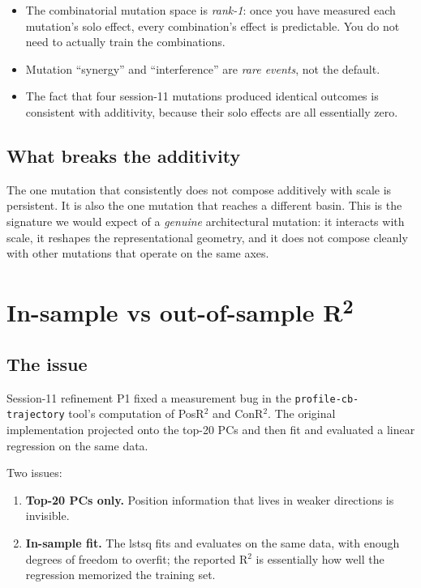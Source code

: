 \documentclass[11pt,openany]{book}
\begin{document}
\begin{itemize}
  \item The combinatorial mutation space is \emph{rank-1}: once you
  have measured each mutation's solo effect, every combination's
  effect is predictable. You do not need to actually train the
  combinations.
  \item Mutation ``synergy'' and ``interference'' are \emph{rare
  events}, not the default.
  \item The fact that four session-11 mutations produced identical
  outcomes is consistent with additivity, because their solo effects
  are all essentially zero.
\end{itemize}

\section{What breaks the additivity}

The one mutation that consistently does not compose additively with
scale is persistent. It is also the one mutation that reaches a
different basin. This is the signature we would expect of a
\emph{genuine} architectural mutation: it interacts with scale, it
reshapes the representational geometry, and it does not compose
cleanly with other mutations that operate on the same axes.

\chapter{In-sample vs out-of-sample R\textsuperscript{2}}

\section{The issue}

Session-11 refinement P1 fixed a measurement bug in the
\texttt{profile-cb-trajectory} tool's computation of PosR$^2$ and
ConR$^2$. The original implementation projected onto the top-20 PCs
and then fit and evaluated a linear regression on the same data.

Two issues:

\begin{enumerate}
  \item \textbf{Top-20 PCs only.} Position information that lives in
  weaker directions is invisible.
  \item \textbf{In-sample fit.} The lstsq fits and evaluates on the
  same data, with enough degrees of freedom to overfit; the reported
  R$^2$ is essentially how well the regression memorized the training
  set.
\end{enumerate}
\end{document}
